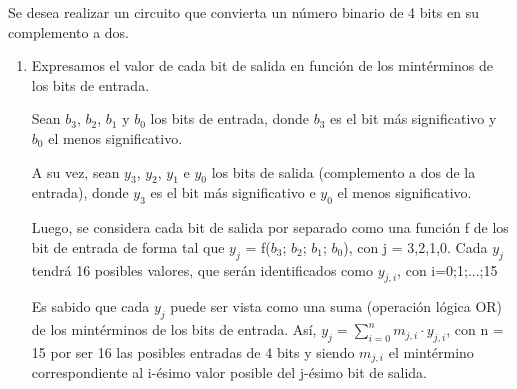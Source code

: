 \documentclass[../../informe/src/main.tex]{subfiles}
\begin{document}
Se desea realizar un circuito que convierta un número binario de 4 bits en su complemento a dos.

\begin{enumerate}

\item Expresamos el valor de cada bit de salida en función de los mintérminos de los bits de entrada.\par
Sean $b_{3}$, $b_{2}$, $b_{1}$ y $b_{0}$ los bits de entrada, donde $b_{3}$ es el bit más significativo y $b_{0}$ el menos significativo.\par
A su vez, sean $y_{3}$, $y_{2}$, $y_{1}$ e $y_{0}$ los bits de salida (complemento a dos de la entrada), donde $y_{3}$ es el bit más significativo e $y_{0}$ el menos significativo. \par
Luego, se considera cada bit de salida por separado como una función f de los bit de entrada de forma tal que $y_{j}$ = f($b_{3}$; $b_{2}$; $b_{1}$; $b_{0}$), con j = 3,2,1,0. Cada $y_{j}$ tendrá 16 posibles valores, que serán identificados como $y_{j,i}$, con i=0;1;...;15\par
Es sabido que cada $y_{j}$ puede ser vista como una suma (operación lógica OR) de los mintérminos de los bits de entrada. 
Así, $y_{j} =\sum\limits_{i=0}^n m_{j,i}\cdot y_{j,i}$, con n = 15 por ser 16 las posibles entradas de 4 bits y siendo $m_{j,i}$ el mintérmino correspondiente al i-ésimo valor posible del j-ésimo bit de salida.\par


\end{enumerate}
\end{document}
